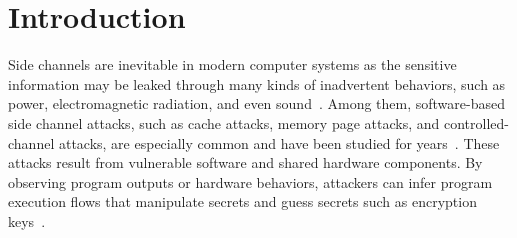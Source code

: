 \section{Introduction} 
Side channels are inevitable in modern computer systems as the sensitive
information may be leaked through many kinds of inadvertent behaviors, such as power,
electromagnetic radiation, and even
sound~\cite{agrawal2002side,kar20178,chari1999towards,217605,genkin2014rsa}.
Among them, software-based side channel attacks, such as cache attacks, memory page
attacks, and controlled-channel attacks, are especially common and have been
studied for
years~\cite{7163052,217543,217589,lee2017inferring,191010,liu2015last}. These
attacks result from vulnerable software and shared hardware components.
By observing program outputs or hardware behaviors, attackers can infer program
execution flows that manipulate secrets and guess secrets such as encryption
keys~\cite{Osvik2006,Gullasch:2011:CGB:2006077.2006784,203878,10.1007/978-3-540-45238-6_6}.



